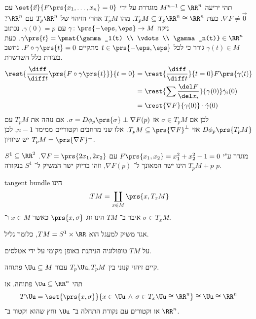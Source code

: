 \documentclass[a4paper,10pt,twoside,openany]{book}
\begin{document}
\begin{example}
תהי יריעה
$M^{n-1} \subseteq \RR^n$
מוגדרת על ידי
$\set{\vec{x}}{F\prs{x_1, \ldots, x_n} = 0}$
עם
$\nabla F \neq \vec{0}$.
כעת
$T_p M \subseteq T_p \RR^n \cong \RR^n$.
מהו
$T_p M$
אחרי הזיהוי של
$T_p\RR^n$
עם
$\RR^n$?
ניקח
$\gamma \colon \prs{-\eps, \eps} \to M$
עם
$\gamma(0) = p$.
נכתוב
$\gamma\prs{t} = \pmat{\gamma_1(t) \\ \vdots \\ \gamma_n(t)} \in \RR^n$.
כעת
$\gamma(t) \in M$
גורר כי לכל
$t \in \prs{-\eps, \eps}$
מתקיים
$F \circ \gamma\prs{t} = 0$.
נחשב בעזרת כלל השרשרת.
\begin{align*}
\rest{\frac{\diff}{\diff t}\prs{F \circ \gamma\prs{t}}}{t=0} &= \rest{\frac{\diff}{\diff t}}{t=0} F\prs{\gamma(t)} \\&=
\rest{\sum \frac{\del F}{\del x_i}}{\gamma(0)} \dot{\gamma}_i(0) \\&=
\rest{\nabla F}{\gamma(0)} \cdot \dot{\gamma}(0)
\end{align*}
לכן אם
$\sigma \in T_p M$
אז
$\sigma = D \phi_p\prs{\sigma} \perp \nabla F (p)$.
אם נזהה את
$T_pM$
עם
$D \phi_p \prs{T_p M}$
אזי
$T_p M \subseteq \prs{\nabla F}^{\perp}$.
אלו שני מרחבים וקטוריים ממימד
$n-1$,
לכן יש שיוויון
$T_p M  = \prs{\nabla F}^{\perp}$.
\end{example}
\begin{example}
$S^1 \subseteq \RR^2$
מוגדר ע"י
$F\prs{x_1, x_2} = x_1^2 + x_2^2 - 1 =0$
עם
$\nabla F = \prs{2x_1, 2x_2}$.
$T_p M + p$
הינו ישר המאונך ל־%
$\nabla F(p)$,
וזהו בדיוק ישר המשיק ל־%
$S^1$
בנקודה
$p$.
\end{example}
\begin{definition}
\textenglish{tangent bundle}
הינו
\[\text{.}TM = \coprod_{x \in M} \prs{x,T_x M}\]
איבר ב־%
$TM$
הינו זוג
$\prs{x, \sigma}$
כאשר
$x \in M$
ו־%
$\sigma \in T_xM$.
\end{definition}
\begin{example}
אגד משיק למעגל הוא
$TM = S^1 \times \RR$,
כלומר גליל.
\end{example}
\begin{remark}
על
$TM$
טופולוגיה הניתנת באופן מקומי על ידי אטלסים.
\end{remark}
\begin{remark}
קיים זיהוי קנוני בין
$T_p \Uu, T_p M$
עבור
$\Uu \subseteq M$
פתוחה.
\end{remark}
\begin{example}
תהי
$\Uu \subseteq \RR^n$
פתוחה. אז
\[T\Uu = \set{\prs{x,\sigma}}{x \in \Uu \,\wedge\, \sigma \in T_x \Uu \cong \RR^n} \cong \Uu \cong \RR^n\]
או וקטורים עם נקודת התחלה ב־%
$\Uu$
וחץ שהוא וקטור ב־%
$\RR^n$.
\end{example}
\end{document}
